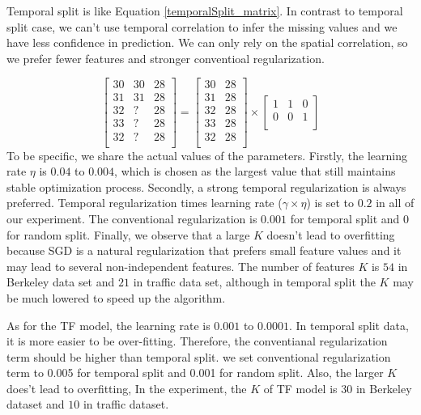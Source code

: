 Temporal split is like Equation \ref{temporalSplit_matrix}.
In contrast to temporal split case, we can't use temporal correlation to infer the missing values and we have less confidence in prediction.
We can only rely on the spatial correlation, so we prefer fewer features and stronger conventioal regularization.

\begin{equation}
\label{temporalSplit_matrix}
\begin{bmatrix}
30 & 30 & 28\\
31 & 31 & 28\\
32 &  ? & 28\\
33 &  ? & 28\\
32 &  ? & 28\\
\end{bmatrix} 
= 
\begin{bmatrix}
30 & 28\\
31 & 28\\
32 & 28\\
33 & 28\\
32 & 28\\
\end{bmatrix} 
\times
\begin{bmatrix}
1 & 1 & 0\\
0 & 0 & 1\\
\end{bmatrix} 
\end{equation}
To be specific, we share the actual values of the parameters.
Firstly, the learning rate $\eta$ is $0.04$ to $0.004$, which is chosen as the largest value that still maintains stable optimization process.
Secondly, a strong temporal regularization is always preferred.
Temporal regularization times learning rate ($\gamma \times \eta$) is set to $0.2$ in all of our experiment.
The conventional regularization is $0.001$ for temporal split and $0$ for random split.
Finally, we observe that a large $K$ doesn't lead to overfitting because SGD is a natural regularization that prefers small feature values and it may lead to several non-independent features.
The number of features $K$ is $54$ in Berkeley data set and $21$ in traffic data set, although in temporal split the $K$ may be much lowered to speed up the algorithm. 

As for the TF model, the learning rate is $0.001$ to $0.0001 $. In temporal split data, it is more easier to be over-fitting. Therefore, the conventianal regularization term should be higher than temporal split. we set conventional regularization term to 0.005 for temporal split and 0.001 for random split. Also, the larger $K$ does't lead to overfitting, In the experiment, the $K$ of TF model  is $30$ in Berkeley dataset and $10$ in traffic dataset.

